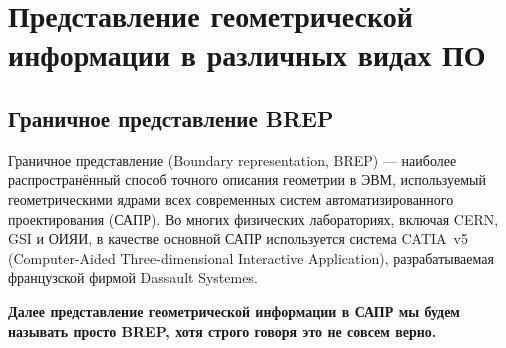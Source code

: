 \section{Представление геометрической информации в различных видах ПО}\label{sec:geoDifferentReprs}


\subsection{Граничное представление BREP}\label{sec:geoCAD}

Граничное представление (Boundary representation, BREP) --- наиболее распространённый способ точного описания геометрии в ЭВМ, используемый геометрическими ядрами всех современных систем автоматизированного проектирования (САПР).
Во многих физических лабораториях, включая CERN, GSI и ОИЯИ, в качестве основной САПР используется система CATIA~v5 (Computer-Aided Three-dimensional Interactive Application), разрабатываемая французской фирмой Dassault Systemes.

\textbf{Далее представление геометрической информации в САПР мы будем называть просто BREP, хотя строго говоря это не совсем верно.}

